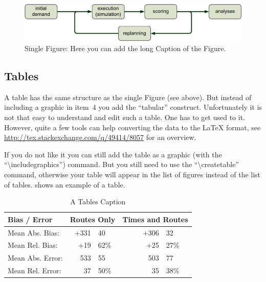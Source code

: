 \begin{figure}%
\caption{Single Figure: Here you can add the long Caption of the Figure.}%
\label{fig:labelOfTheSingleFigure}%
\includegraphics[width=1.0\textwidth]{figures/MATSimLoop}%
\ivthline
\end{figure}

\subsection{Tables} \label{sec:compStructs-Tables}

A table has the same structure as the single Figure (see above). But
instead of including a graphic in item~4 you add the ``tabular''
construct.
Unfortunately it is not that easy to understand and edit such a table. One has
to get used to it. 
However, quite a few tools can help converting the data
to the \LaTeX{} format,
see \url{http://tex.stackexchange.com/q/49414/8057}
for an overview.

If you do not like it you can still add the table
as a graphic (with the ``\textbackslash{}includegraphics'') command.
But you still need
to use the ``\textbackslash{}createtable'' command,
otherwise your table will appear
in the list of figures instead of the list of tables.
 shows an example of a table.

\begin{table}[!ht]
\caption{A Tables  Caption}
\label{tab:labelOfTheTable}%

\begin{tabular}[c]{lr@{.}lcr@{.}l}
    \toprule
    Bias / Error     & \multicolumn{2}{c}{Routes Only} &
\multicolumn{3}{c}{Times and Routes} \\
    \midrule
    Mean Abs. Bias:  & $+$331&40                        && $+$306&32  
                         \\
    Mean Rel. Bias:  &  $+$19&62\%                      &&  $+$25&27\%
                         \\
    \midrule
    Mean Abs. Error: &    533&55                        &&    503&77  
                         \\
    Mean Rel. Error: &     37&50\%                      &&     35&38\%
                         \\
    \bottomrule
  \end{tabular}

\ivthline
\end{table}


